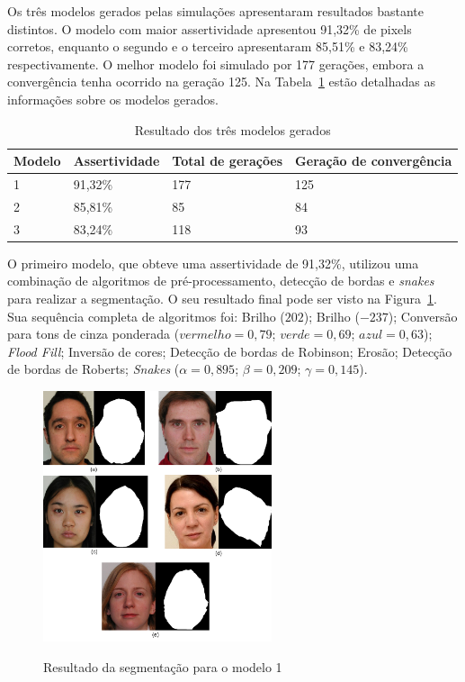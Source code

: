 \documentclass[12pt,oneside,a4paper,english,french,spanish,brazil,]{abntex2}
\begin{document}
Os três modelos gerados pelas simulações apresentaram resultados bastante distintos. O modelo com maior assertividade apresentou 91,32\% de pixels corretos, enquanto o segundo e o terceiro apresentaram 85,51\% e 83,24\% respectivamente. O melhor modelo foi simulado por 177 gerações, embora a convergência tenha ocorrido na geração 125. Na Tabela~\ref{tab:ModelosGerados} estão detalhadas as informações sobre os modelos gerados.

\begin{table}[!htbp]
\centering
\caption{Resultado dos três modelos gerados}
\label{tab:ModelosGerados}
\begin{tabular}{llll}
\hline
\textbf{Modelo} & \textbf{Assertividade} & \textbf{Total de gerações} & \textbf{Geração de convergência} \\ \hline
1               & 91,32\%                & 177                        & 125                              \\
2               & 85,81\%                  & 85                         & 84                               \\
3               & 83,24\%                  & 118                        & 93                               \\ \hline
\end{tabular}
\end{table}

O primeiro modelo, que obteve uma assertividade de 91,32\%, utilizou uma combinação de algoritmos de pré-processamento, detecção de bordas e \textit{snakes} para realizar a segmentação. O seu resultado final pode ser visto na Figura~\ref{fig:DES_Resultado_1}. Sua sequência completa de algoritmos foi: Brilho (\(202\)); Brilho (\(-237\)); Conversão para tons de cinza ponderada (\(vermelho = 0,79\); \(verde = 0,69\); \(azul = 0,63\)); \textit{Flood Fill}; Inversão de cores; Detecção de bordas de Robinson; Erosão; Detecção de bordas de Roberts; \textit{Snakes} (\(\alpha = 0,895\); \(\beta = 0,209\); \(\gamma = 0,145\)).

\begin{figure}[ht]
\centering
\caption{Resultado da segmentação para o modelo 1}
\includegraphics[width=0.6\textwidth]{imagens/DES_Resultado_1.pdf}
\sourceAuthor{}
\label{fig:DES_Resultado_1}
\end{figure}
\end{document}
